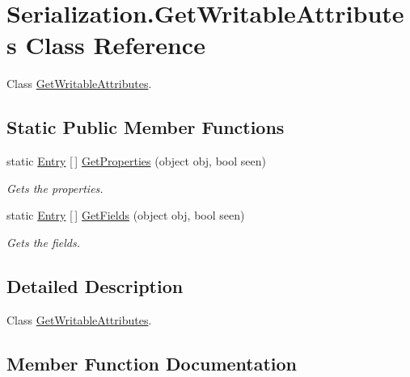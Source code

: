 \hypertarget{class_serialization_1_1_get_writable_attributes}{}\section{Serialization.\+Get\+Writable\+Attributes Class Reference}
\label{class_serialization_1_1_get_writable_attributes}


Class \hyperlink{class_serialization_1_1_get_writable_attributes}{Get\+Writable\+Attributes}.  


\subsection*{Static Public Member Functions}
\begin{DoxyCompactItemize}
\item 
static \hyperlink{class_serialization_1_1_entry}{Entry} \mbox{[}$\,$\mbox{]} \hyperlink{class_serialization_1_1_get_writable_attributes_a328ba45c8e2f2e9678371ca201974632}{Get\+Properties} (object obj, bool seen)
\begin{DoxyCompactList}\small\item\em Gets the properties. \end{DoxyCompactList}\item 
static \hyperlink{class_serialization_1_1_entry}{Entry} \mbox{[}$\,$\mbox{]} \hyperlink{class_serialization_1_1_get_writable_attributes_a10c919168247cac64afcf05af9d56838}{Get\+Fields} (object obj, bool seen)
\begin{DoxyCompactList}\small\item\em Gets the fields. \end{DoxyCompactList}\end{DoxyCompactItemize}


\subsection{Detailed Description}
Class \hyperlink{class_serialization_1_1_get_writable_attributes}{Get\+Writable\+Attributes}. 



\subsection{Member Function Documentation}
\mbox{\label{class_serialization_1_1_get_writable_attributes_a10c919168247cac64afcf05af9d56838}} 
